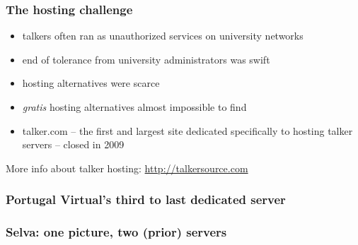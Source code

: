 \documentclass[aspectratio=169]{beamer}
\begin{document}
\begin{frame}
\frametitle{The hosting challenge}
  \begin{itemize}
    \item{} talkers often ran as unauthorized services on university networks
    \item{} end of tolerance from university administrators was swift
    \item{} hosting alternatives were scarce
    \item{} \emph{gratis} hosting alternatives almost impossible to find
    \item{} talker.com -- the first and largest site dedicated specifically to hosting talker servers -- closed in 2009
  \end{itemize}
  More info about talker hosting: \url{http://talkersource.com}
\end{frame}

\begin{frame}
\frametitle{Portugal Virtual's third to last dedicated server}
\end{frame}

\begin{frame}
  \frametitle{Selva: one picture, two (prior) servers}
\end{frame}
\end{document}
